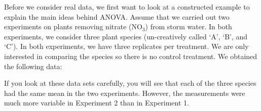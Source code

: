 \documentclass[
  letterpaper,
]{book}
\begin{document}
Before we consider real data, we first want to look at a constructed
example to explain the main ideas behind ANOVA. Assume that we carried
out two experiments on plants removing nitrate (NO\(_3\)) from storm
water. In both experiments, we consider three plant species
(un-creatively called `A', `B', and `C'). In both experiments, we have
three replicates per treatment. We are only interested in comparing the
species so there is no control treatment. We obtained the following
data:

\begin{table}

\caption{\label{tbl-panel}Hypothetical Experiment}

\begin{minipage}{0.50\linewidth}



\end{minipage}%
%
\begin{minipage}{0.50\linewidth}



\end{minipage}%

\end{table}%

If you look at these data sets carefully, you will see that each of the
three species had the same mean in the two experiments. However, the
measurements were much more variable in Experiment 2 than in Experiment
1.
\end{document}

